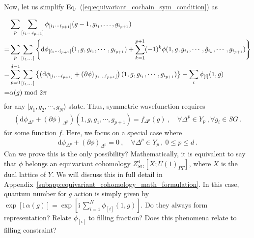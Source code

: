 \documentclass[%
 reprint,
 amsmath,amssymb,
 aps,pra,
]{revtex4-1}
\newcommand{\dd}{\mathrm{d}} %
\newcommand{\ii}{\mathrm{i}\,} %
\begin{document}
Now, let us simplify Eq.~(\ref{eq:equivariant_cochain_sym_condition}) as
\begin{widetext}
\begin{align}
    &\sum_{p}\sum_{[i_1\cdots i_{p+1}]}\phi_{[i_1\cdots i_{p+1}]}(g-1,g_{i_1},\dots,g_{i_{p+1}})\notag\\
    =&\sum_p\sum_{[i_1\dots]}\left\{ \dd \phi_{[i_1\cdots i_{p+1}]}(1,g,g_{i_1},\cdots,g_{i_{p+1}})+\sum_{k=1}^{p+1}(-1)^k\phi(1,g,g_{i_1},\cdots,\hat{g}_{i_k},\cdots,g_{i_{p+1}}) \right\}\notag\\
    =&\sum_{p=0}^{d-1}\sum_{[i_1\dots]}\left\{ \left(\dd\phi_{[i_1\cdots i_{p+1}]} +(\partial\phi)_{[i_1\dots i_{p+1}]}\right)(1,g,g_{i_1},\cdots,g_{i_{p+1}})\right\}
    -\sum_{i}\phi_{[i]}(1,g)\notag\\
    =&\alpha(g)\!\!\mod 2\pi
\end{align}
for any $|g_1,g_2,\cdots,g_N\rangle$ state.
Thus, symmetric wavefunction requires 
\begin{align}
\left(\dd\phi_{\Delta^p} +(\partial\phi)_{\Delta^p}\right)(1,g,g_1,\cdots,g_{p+1})=f_{\Delta^p}(g)~,\quad \forall \Delta^p\in Y_p~,\forall g_i\in SG~.
\end{align}
for some function $f$.
Here, we focus on a special case where
\begin{align}
    \dd\phi_{\Delta^p}+(\partial\phi)_{\Delta^p}=0~,\quad\forall \Delta^p\in Y_p~,~0\le p\le d~.
\label{eq:equivariant_cocycle_condition}
\end{align}
{\color{red} Can we prove this is the only possibility?}
Mathematically, it is equivalent to say that $\phi$ belongs an equivariant cohomology $Z^d_{SG}[X;U(1)_{PT}]$, where $X$ is the dual lattice of $Y$.
We will discuss this in full detail in Appendix~\ref{subapp:equivariant_cohomology_math_formulation}.
In this case, quantum number for $g$ action is simply given by $\exp[\ii\alpha(g)]=\exp\left[\ii\sum_{i=1}^N \phi_{[i]}(1,g)\right]$.
{\color{red} Do they always form representation? Relate $\phi_{[i]}$ to filling fraction? Does this phenomena relate to filling constraint?}
\end{widetext}
\end{document}
